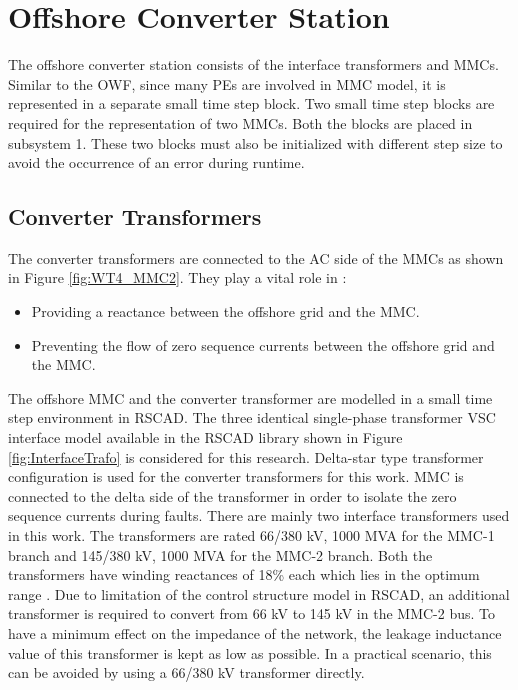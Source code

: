 \section{Offshore Converter Station}
The offshore converter station consists of the interface transformers and \gls{MMC}s. Similar to the \gls{OWF}, since many \gls{PE}s are involved in \gls{MMC} model, it is represented in a separate small time step block. Two small time step blocks are required for the representation of two \gls{MMC}s. Both the blocks are placed in subsystem 1. These two blocks must also be initialized with different step size to avoid the occurrence of an error during runtime. 

\subsection{Converter Transformers}
The converter transformers are connected to the \gls{AC} side of the \gls{MMC}s  as shown in Figure \ref{fig:WT4_MMC2}. They play a vital role in \cite{cigre2005b4}:
\begin{itemize}
    \item Providing a reactance between the offshore grid and the \gls{MMC}.
    \item Preventing the flow of zero sequence currents between the offshore grid and the \gls{MMC}.
\end{itemize} 

The offshore \gls{MMC} and the converter transformer are modelled in a small time step environment in RSCAD. The three identical single-phase transformer \gls{VSC} interface model available in the RSCAD library shown in Figure \ref{fig:InterfaceTrafo} is considered for this research. Delta-star type transformer configuration is used for the converter transformers for this work. \gls{MMC} is connected to the delta side of the transformer in order to isolate the zero sequence currents during faults. There are mainly two interface transformers used in this work. The transformers are rated 66/380 kV, 1000 MVA for the \gls{MMC}-1 branch and 145/380 kV, 1000 MVA for the \gls{MMC}-2 branch. Both the transformers have winding reactances of 18\% each which lies in the optimum range \cite{cigre2005b4}. Due to limitation of the control structure model in RSCAD, an additional transformer is required to convert from 66 kV to 145 kV in the \gls{MMC}-2 bus. To have a minimum effect on the impedance of the network, the leakage inductance value of this transformer is kept as low as possible. In a practical scenario, this can be avoided by using a 66/380 kV transformer directly. 

